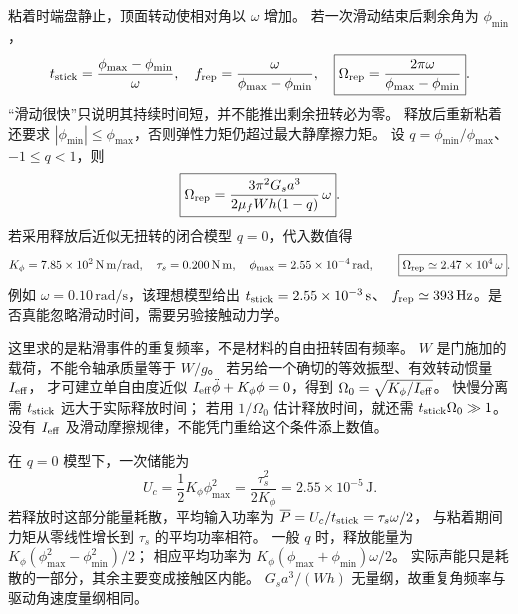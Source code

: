 \begin{xesolution}
粘着时端盘静止，顶面转动使相对角以 $\omega$ 增加。
若一次滑动结束后剩余角为 $\phi_{\min}$，
\[
 t_{\rm stick}=\frac{\phi_{\max}-\phi_{\min}}{\omega},\quad
 f_{\rm rep}=\frac{\omega}{\phi_{\max}-\phi_{\min}},\quad
 \boxed{\Omega_{\rm rep}=\frac{2\pi\omega}{\phi_{\max}-\phi_{\min}}}.
\]
“滑动很快”只说明其持续时间短，并不能推出剩余扭转必为零。
释放后重新粘着还要求 $|\phi_{\min}|\le\phi_{\max}$，否则弹性力矩仍超过最大静摩擦力矩。
设 $q=\phi_{\min}/\phi_{\max}$、$-1\le q<1$，则
\[
 \boxed{\Omega_{\rm rep}=\frac{3\pi^2G_sa^3}{2\mu_fWh(1-q)}\,\omega}.
\]
若采用释放后近似无扭转的闭合模型 $q=0$，代入数值得
\[
 K_\phi=7.85\times10^2\,\mathrm{N\,m/rad},\quad
 \tau_s=0.200\,\mathrm{N\,m},\quad
 \phi_{\max}=2.55\times10^{-4}\,\mathrm{rad},
 \qquad
 \boxed{\Omega_{\rm rep}\simeq2.47\times10^4\,\omega}.
\]
例如 $\omega=0.10\,\mathrm{rad/s}$，该理想模型给出
$t_{\rm stick}=2.55\times10^{-3}\,\mathrm s$、
$f_{\rm rep}\simeq393\,\mathrm{Hz}$。是否真能忽略滑动时间，需要另验接触动力学。

这里求的是粘滑事件的重复频率，不是材料的自由扭转固有频率。
$W$ 是门施加的载荷，不能令轴承质量等于 $W/g$。
若另给一个确切的等效振型、有效转动惯量 $I_{\rm eff}$，
才可建立单自由度近似
$I_{\rm eff}\ddot\phi+K_\phi\phi=0$，得到
$\Omega_0=\sqrt{K_\phi/I_{\rm eff}}$。
快慢分离需 $t_{\rm stick}$ 远大于实际释放时间；
若用 $1/\Omega_0$ 估计释放时间，就还需 $t_{\rm stick}\Omega_0\gg1$。
没有 $I_{\rm eff}$ 及滑动摩擦规律，不能凭门重给这个条件添上数值。

在 $q=0$ 模型下，一次储能为
\[
 U_c=\frac12K_\phi\phi_{\max}^2
 =\frac{\tau_s^2}{2K_\phi}=2.55\times10^{-5}\,\mathrm J.
\]
若释放时这部分能量耗散，平均输入功率为
$\overline P=U_c/t_{\rm stick}=\tau_s\omega/2$，
与粘着期间力矩从零线性增长到 $\tau_s$ 的平均功率相符。
一般 $q$ 时，释放能量为
$K_\phi(\phi_{\max}^2-\phi_{\min}^2)/2$；
相应平均功率为 $K_\phi(\phi_{\max}+\phi_{\min})\omega/2$。
实际声能只是耗散的一部分，其余主要变成接触区内能。
$G_sa^3/(Wh)$ 无量纲，故重复角频率与驱动角速度量纲相同。
\end{xesolution}
